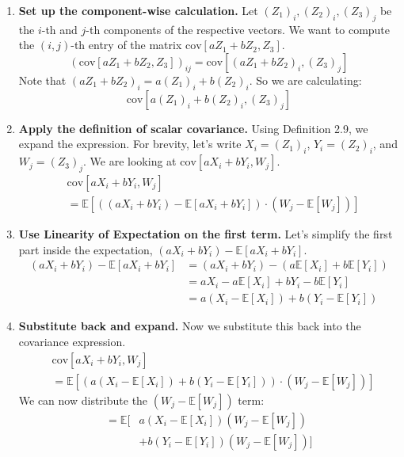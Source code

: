 \documentclass[11pt,a4paper]{article}
\begin{document}
\begin{enumerate}
    \item \textbf{Set up the component-wise calculation.}
    Let $(Z_1)_i, (Z_2)_i, (Z_3)_j$ be the $i$-th and $j$-th components of the respective vectors. We want to compute the $(i,j)$-th entry of the matrix $\text{cov}[aZ_1 + bZ_2, Z_3]$.
    \[
        (\text{cov}[aZ_1 + bZ_2, Z_3])_{ij} = \text{cov}[(aZ_1 + bZ_2)_i, (Z_3)_j]
    \]
    Note that $(aZ_1 + bZ_2)_i = a(Z_1)_i + b(Z_2)_i$. So we are calculating:
    \[
        \text{cov}[a(Z_1)_i + b(Z_2)_i, (Z_3)_j]
    \]

    \item \textbf{Apply the definition of scalar covariance.}
    Using Definition 2.9, we expand the expression. For brevity, let's write $X_i = (Z_1)_i$, $Y_i = (Z_2)_i$, and $W_j = (Z_3)_j$. We are looking at $\text{cov}[aX_i+bY_i, W_j]$.
    \begin{align*}
        &\text{cov}[aX_i+bY_i, W_j] \\
        &= \mathbb{E}[ ((aX_i+bY_i) - \mathbb{E}[aX_i+bY_i]) \cdot (W_j - \mathbb{E}[W_j]) ]
    \end{align*}

    \item \textbf{Use Linearity of Expectation on the first term.}
    Let's simplify the first part inside the expectation, $(aX_i+bY_i) - \mathbb{E}[aX_i+bY_i]$.
    \begin{align*}
        (aX_i+bY_i) - \mathbb{E}[aX_i+bY_i] &= (aX_i+bY_i) - (a\mathbb{E}[X_i] + b\mathbb{E}[Y_i]) \\
        &= aX_i - a\mathbb{E}[X_i] + bY_i - b\mathbb{E}[Y_i] \\
        &= a(X_i - \mathbb{E}[X_i]) + b(Y_i - \mathbb{E}[Y_i])
    \end{align*}

    \item \textbf{Substitute back and expand.}
    Now we substitute this back into the covariance expression.
    \begin{align*}
        &\text{cov}[aX_i+bY_i, W_j] \\
        &= \mathbb{E}[ (a(X_i - \mathbb{E}[X_i]) + b(Y_i - \mathbb{E}[Y_i])) \cdot (W_j - \mathbb{E}[W_j]) ]
    \end{align*}
    We can now distribute the $(W_j - \mathbb{E}[W_j])$ term:
    \begin{align*}
        = \mathbb{E}[ &a(X_i - \mathbb{E}[X_i])(W_j - \mathbb{E}[W_j]) \\
        &+ b(Y_i - \mathbb{E}[Y_i])(W_j - \mathbb{E}[W_j]) ]
    \end{align*}


\end{enumerate}
\end{document}
